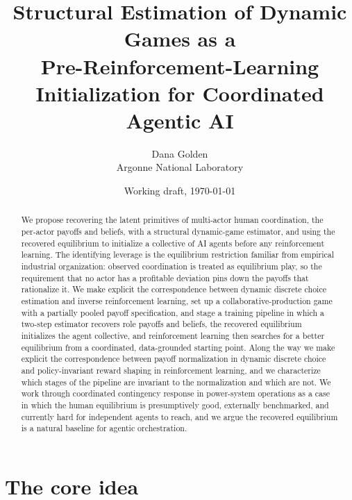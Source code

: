 \documentclass[11pt]{article}
\title{Structural Estimation of Dynamic Games as a\\ Pre-Reinforcement-Learning Initialization for Coordinated Agentic AI}
\author{Dana Golden\\[2pt] \small Argonne National Laboratory}
\date{Working draft, \today}
\theoremstyle{definition}
\begin{document}
\maketitle

\begin{abstract}
\noindent We propose recovering the latent primitives of multi-actor human coordination, the per-actor payoffs and beliefs, with a structural dynamic-game estimator, and using the recovered equilibrium to initialize a collective of AI agents before any reinforcement learning. The identifying leverage is the equilibrium restriction familiar from empirical industrial organization: observed coordination is treated as equilibrium play, so the requirement that no actor has a profitable deviation pins down the payoffs that rationalize it. We make explicit the correspondence between dynamic discrete choice estimation and inverse reinforcement learning, set up a collaborative-production game with a partially pooled payoff specification, and stage a training pipeline in which a two-step estimator recovers role payoffs and beliefs, the recovered equilibrium initializes the agent collective, and reinforcement learning then searches for a better equilibrium from a coordinated, data-grounded starting point. Along the way we make explicit the correspondence between payoff normalization in dynamic discrete choice and policy-invariant reward shaping in reinforcement learning, and we characterize which stages of the pipeline are invariant to the normalization and which are not. We work through coordinated contingency response in power-system operations as a case in which the human equilibrium is presumptively good, externally benchmarked, and currently hard for independent agents to reach, and we argue the recovered equilibrium is a natural baseline for agentic orchestration.
\end{abstract}

\section{The core idea}
\end{document}
